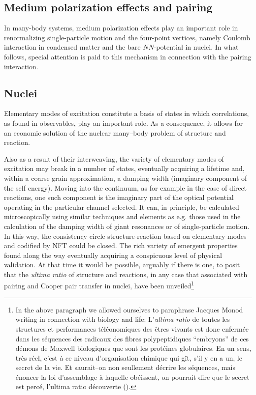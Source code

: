 




\begin{subappendices}
\section{Medium polarization effects and pairing}\label{C3AppEx}
In many-body systems, medium polarization effects play an important role in renormalizing single-particle motion and the four-point vertices, namely Coulomb interaction in condensed matter and the bare $NN$-potential in nuclei. In what follows, special attention is paid to this mechanism in connection with the pairing interaction.
\subsection{Nuclei}
Elementary modes of excitation constitute a basis of states in which correlations, as found in observables, play an important role. As a consequence, it allows for an economic solution of the nuclear many--body problem of structure and reaction.


Also as a result of their interweaving,  the variety of elementary modes of excitation may break in a number of states, eventually acquiring a lifetime and, within a coarse grain approximation, a damping width (imaginary component of the self energy). Moving into the continuum, as for example in the case of direct reactions, one such component is the imaginary part of the optical potential operating in the particular channel selected. It can, in principle, be calculated microscopically using similar techniques and elements as e.g. those used in the calculation of the damping width of giant resonances or of single-particle motion. In this way, the consistency circle structure-reaction based on elementary modes and codified by NFT could be closed. The rich variety of emergent properties found along the way eventually acquiring a conspicuous level of physical validation. At that time it would be possible, arguably if there is one, to posit that the \textit{ultima ratio} of structure and reactions, in any case that associated with pairing and Cooper pair transfer in nuclei, have been unveiled\footnote{In the above paragraph we allowed ourselves to paraphrase Jacques Monod writing in connection with biology and life: L'\textit{ultima ratio} de toutes les structures et performances t\'el\'eonomiques des \^etres vivants est donc enferm\'ee dans les s\'equences des radicaux des fibres polypeptidiques ``embryons'' de ces d\'emons de Maxwell biologiques que sont les prot\'eines globulaires. En un sens, tr\`{e}s r\'{e}el, c'est \`a ce niveau d'organisation chimique qui g\^it, s'il y en a un, le secret de la vie. Et saurait--on non seullement d\'ecrire les s\'equences, mais \'enoncer la loi d'assemblage \`a laquelle ob\'eissent, on pourrait dire que le secret est perc\'e, l'ultima ratio d\'ecouverte (\cite{Monod:70}).}

\end{subappendices}
